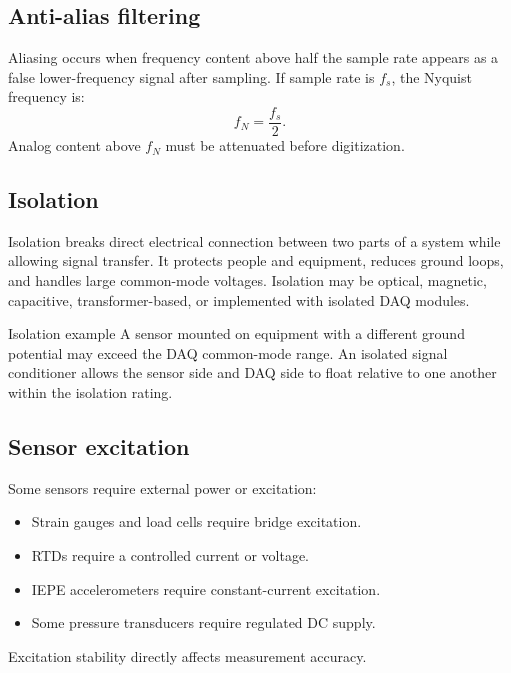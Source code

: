 \documentclass[11pt]{article}
\begin{document}
\subsection{Anti-alias filtering}
Aliasing occurs when frequency content above half the sample rate appears as a
false lower-frequency signal after sampling. If sample rate is \(f_s\), the
Nyquist frequency is:
\[
f_N = \frac{f_s}{2}.
\]
Analog content above \(f_N\) must be attenuated before digitization.

\begin{center}
\end{center}

\subsection{Isolation}
Isolation breaks direct electrical connection between two parts of a system
while allowing signal transfer. It protects people and equipment, reduces ground
loops, and handles large common-mode voltages. Isolation may be optical,
magnetic, capacitive, transformer-based, or implemented with isolated DAQ
modules.

\begin{examplebox}{Isolation example}
A sensor mounted on equipment with a different ground potential may exceed the
DAQ common-mode range. An isolated signal conditioner allows the sensor side and
DAQ side to float relative to one another within the isolation rating.
\end{examplebox}

\subsection{Sensor excitation}
Some sensors require external power or excitation:
\begin{itemize}
  \item Strain gauges and load cells require bridge excitation.
  \item RTDs require a controlled current or voltage.
  \item IEPE accelerometers require constant-current excitation.
  \item Some pressure transducers require regulated DC supply.
\end{itemize}
Excitation stability directly affects measurement accuracy.
\end{document}
